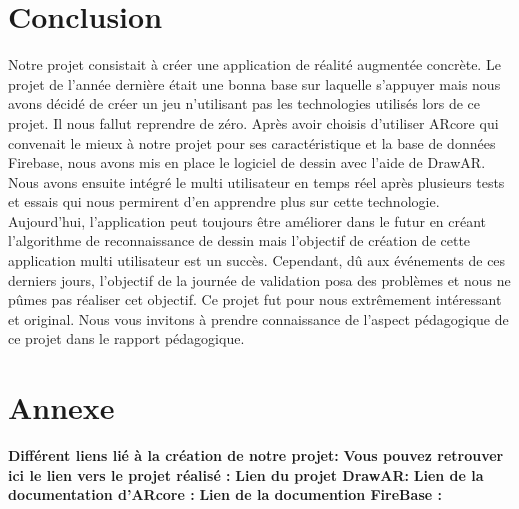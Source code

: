\documentclass[12pt]{article}
\begin{document}
\section{Conclusion}
Notre projet consistait à créer une application de réalité augmentée concrète. Le projet de l'année dernière était une bonna base sur laquelle s'appuyer mais nous avons décidé de créer un jeu n'utilisant pas les technologies utilisés lors de ce projet. Il nous fallut reprendre de zéro. Après avoir choisis d'utiliser  ARcore qui convenait le mieux à notre projet pour ses caractéristique et la base de données Firebase, nous avons mis en place le logiciel de dessin avec l'aide de DrawAR. Nous avons ensuite intégré le multi utilisateur en temps réel après plusieurs tests et essais qui nous permirent d'en apprendre plus sur cette technologie. Aujourd'hui, l'application peut toujours être améliorer dans le futur en créant l'algorithme de reconnaissance de dessin mais l'objectif de création de cette application multi utilisateur est un succès. Cependant, dû aux événements de ces derniers jours, l'objectif de la journée de validation posa des problèmes et nous ne pûmes pas réaliser cet objectif.
\newline
Ce projet fut pour nous extrêmement intéressant et original. Nous vous invitons à prendre connaissance de l'aspect pédagogique de ce projet dans le rapport pédagogique.
\section{Annexe}
\textbf{Différent liens lié à la création de notre projet:}
\newline
\newline
\textbf{Vous pouvez retrouver ici le lien vers le projet réalisé : }
\newline
\href{https://github.com/Deathpioupiou/Project_master_1}{}
\newline
\newline
\textbf{Lien du projet DrawAR:}
\newline
\href{https://github.com/googlecreativelab/ar-drawing-java/blob/master/app/src/main/java/com/googlecreativelab/drawar/DrawAR.java}{}
\newline
\newline
\textbf{Lien de la documentation d'ARcore : }
\newline
\href{https://developers.google.com/ar/reference/java}{}
\newline
\newline
\textbf{Lien de la documention FireBase : }
\newline
\href{https://firebase.google.com/docs/database}{}
\end{document}
